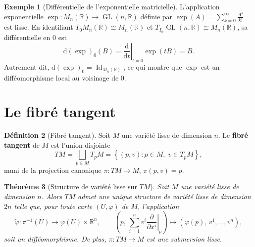 \documentclass[12pt,a4paper,openany]{book}
\theoremstyle{definition}
\newtheorem{definition}{Définition}[chapter]
\newtheorem{exemple}[definition]{Exemple}
\theoremstyle{plain}
\newtheorem{theoreme}[definition]{Théorème}
\theoremstyle{remark}
\newcommand{\R}{\mathbb{R}}
\DeclareMathOperator{\Id}{Id}
\DeclareMathOperator{\GL}{GL}
\newcommand{\dd}{\mathrm{d}}
\newcommand{\set}[1]{\left\{#1\right\}}
\begin{document}
\begin{exemple}[Différentielle de l'exponentielle matricielle]\label{ex:diff-exp}
L'application exponentielle $\exp : M_n(\R) \to \GL(n, \R)$ définie par
$\exp(A) = \sum_{k=0}^\infty \frac{A^k}{k!}$ est lisse. En identifiant
$T_0 M_n(\R) \cong M_n(\R)$ et $T_{I_n}\GL(n,\R) \cong M_n(\R)$, sa
différentielle en $0$ est
\[
  \dd(\exp)_0(B) = \left.\frac{\dd}{\dd t}\right|_{t=0} \exp(tB) = B.
\]
Autrement dit, $\dd(\exp)_0 = \Id_{M_n(\R)}$, ce qui montre que $\exp$ est un
difféomorphisme local au voisinage de $0$.
\end{exemple}

\section{Le fibré tangent}\label{sec:fibre-tangent}

\begin{definition}[Fibré tangent]\label{def:fibre-tangent}
Soit $M$ une variété lisse de dimension $n$. Le \textbf{fibré tangent}
de $M$ est l'union disjointe
\[
  TM = \bigsqcup_{p \in M} T_pM = \set{(p, v) : p \in M,\; v \in T_pM},
\]
muni de la projection canonique $\pi : TM \to M$, $\pi(p, v) = p$.
\end{definition}

\begin{theoreme}[Structure de variété lisse sur $TM$]\label{thm:TM-variete}
Soit $M$ une variété lisse de dimension $n$. Alors $TM$ admet une unique structure
de variété lisse de dimension $2n$ telle que, pour toute carte $(U, \varphi)$ de $M$,
l'application
\[
  \widetilde{\varphi} : \pi^{-1}(U) \longrightarrow \varphi(U) \times \R^n, \qquad
  \left(p,\, \sum_{i=1}^n v^i \left.\frac{\partial}{\partial x^i}\right|_p\right)
  \longmapsto (\varphi(p),\, v^1, \ldots, v^n),
\]
soit un difféomorphisme. De plus, $\pi : TM \to M$ est une submersion lisse.
\end{theoreme}
\end{document}

